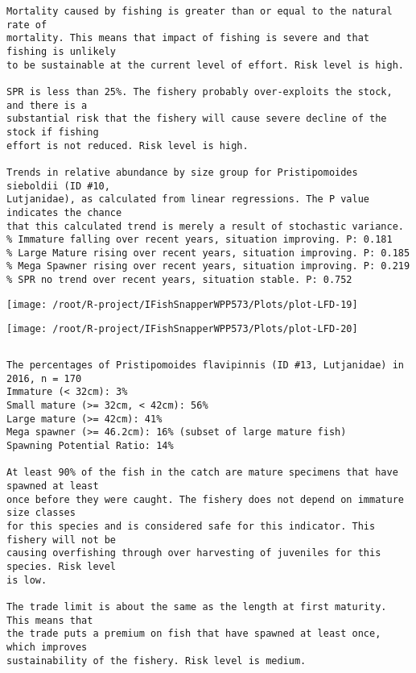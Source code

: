\documentclass{report}\usepackage[]{graphicx}\usepackage[]{color}
\makeatletter
\def\maxwidth{ %
  \ifdim\Gin@nat@width>\linewidth
    \linewidth
  \else
    \Gin@nat@width
  \fi
}
\newenvironment{kframe}{%
 \def\at@end@of@kframe{}%
 \ifinner\ifhmode%
  \def\at@end@of@kframe{\end{minipage}}%
  \begin{minipage}{\columnwidth}%
 \fi\fi%
 \def\FrameCommand##1{\hskip\@totalleftmargin \hskip-\fboxsep
 \colorbox{shadecolor}{##1}\hskip-\fboxsep
     \hskip-\linewidth \hskip-\@totalleftmargin \hskip\columnwidth}%
 \MakeFramed {\advance\hsize-\width
   \@totalleftmargin\z@ \linewidth\hsize
   \@setminipage}}%
 {\par\unskip\endMakeFramed%
 \at@end@of@kframe}
\newenvironment{knitrout}{}{} %
\makeatother
\begin{document}
\begin{knitrout}
\begin{kframe}
\begin{verbatim}
Mortality caused by fishing is greater than or equal to the natural rate of
mortality. This means that impact of fishing is severe and that fishing is unlikely
to be sustainable at the current level of effort. Risk level is high.
 
SPR is less than 25%. The fishery probably over-exploits the stock, and there is a
substantial risk that the fishery will cause severe decline of the stock if fishing
effort is not reduced. Risk level is high.
 
Trends in relative abundance by size group for Pristipomoides sieboldii (ID #10,
Lutjanidae), as calculated from linear regressions. The P value indicates the chance
that this calculated trend is merely a result of stochastic variance.
% Immature falling over recent years, situation improving. P: 0.181
% Large Mature rising over recent years, situation improving. P: 0.185
% Mega Spawner rising over recent years, situation improving. P: 0.219
% SPR no trend over recent years, situation stable. P: 0.752
\end{verbatim}
\end{kframe}
\texttt{[image: /root/R-project/IFishSnapperWPP573/Plots/plot-LFD-19]} 

\texttt{[image: /root/R-project/IFishSnapperWPP573/Plots/plot-LFD-20]} 
\begin{kframe}\begin{verbatim}
\end{verbatim}
\end{kframe}
\clearpage
\newpage
\begin{kframe}\begin{verbatim}The percentages of Pristipomoides flavipinnis (ID #13, Lutjanidae) in 2016, n = 170
Immature (< 32cm): 3%
Small mature (>= 32cm, < 42cm): 56%
Large mature (>= 42cm): 41%
Mega spawner (>= 46.2cm): 16% (subset of large mature fish)
Spawning Potential Ratio: 14%
 
At least 90% of the fish in the catch are mature specimens that have spawned at least
once before they were caught. The fishery does not depend on immature size classes
for this species and is considered safe for this indicator. This fishery will not be
causing overfishing through over harvesting of juveniles for this species. Risk level
is low.

The trade limit is about the same as the length at first maturity.  This means that
the trade puts a premium on fish that have spawned at least once, which improves
sustainability of the fishery. Risk level is medium.


\end{verbatim}
\end{kframe}
\end{knitrout}
\end{document}
